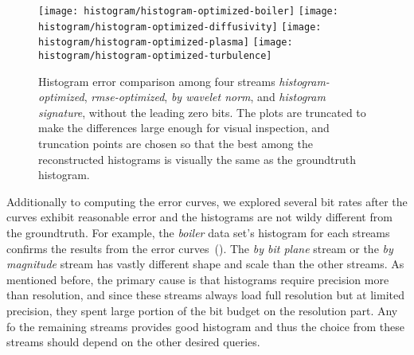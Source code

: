 \begin{figure}[h]
	\centering
	{\texttt{[image: histogram/histogram-optimized-boiler]}}
	{\texttt{[image: histogram/histogram-optimized-diffusivity]}}
	{\texttt{[image: histogram/histogram-optimized-plasma]}}
	{\texttt{[image: histogram/histogram-optimized-turbulence]}}
	\caption{Histogram error comparison among four streams \emph{histogram-optimized},
	\emph{rmse-optimized}, \emph{by wavelet norm}, and \emph{histogram signature}, without the leading
	zero bits. The plots are truncated to make the differences large enough for visual inspection, and
	truncation points are chosen so that the best among the reconstructed histograms is visually the
	same as the groundtruth histogram. }
	\label{fig:histogram-stream-comparison}
\end{figure}


Additionally to computing the error curves, we explored several bit rates after the curves exhibit
reasonable error and the histograms are not wildy different from the groundtruth. For example, the {\em boiler}
data set's histogram for each streams confirms the results from the error curves~().
The {\em by bit plane} stream or the {\em by magnitude} stream has vastly different shape and scale than the other
streams. As mentioned before, the primary cause is that histograms require precision more than resolution, and since these streams
always load full resolution but at limited precision, they spent large portion of the bit budget on the resolution part.
Any fo the remaining streams provides good histogram and thus the choice from these streams should depend on the other
desired queries.


